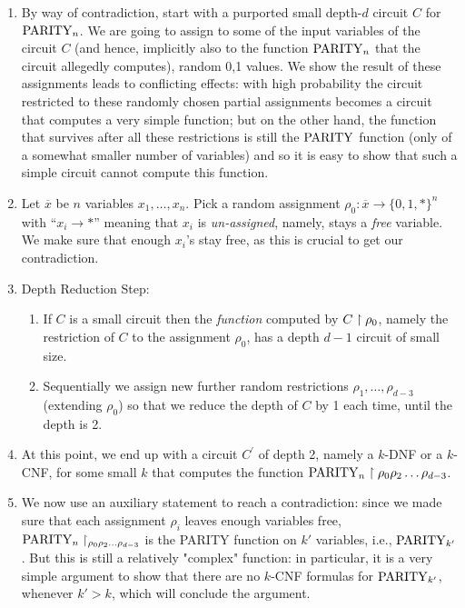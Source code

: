 \begin{enumerate}
\item By  way of contradiction, start with a purported small depth-$d$ circuit $C$ for $\operatorname{PARITY}_n$.
We are going to assign to some of the input variables of the circuit $C$ (and hence, implicitly also to the function $\operatorname{PARITY}_n$ that the circuit  allegedly  computes), random 0,1 values. We show the result of these assignments leads to conflicting effects: with high probability  the circuit restricted to these randomly chosen partial assignments becomes a circuit that computes a very simple function; but on the other hand,  the function that survives after all these restrictions is still the $\operatorname{PARITY}$ function (only of a somewhat smaller number of variables) and so it is easy to show that such a simple circuit cannot compute this function.

\item Let $\overline x$ be $n$ variables $x_1,\dots,x_n$. Pick a random assignment $\rho_0: \overline x \rightarrow\{0,1, *\}^n$ with ``$x_i \rightarrow *$'' meaning that $x_i$ is \emph{un-assigned}, namely, stays a \emph{free} variable. We make sure that enough $x_i$'s stay  free, as this is crucial to get our contradiction.
\label{it:two-165}

\item Depth Reduction Step: 

\begin{enumerate}
\item 
If $C$ is a small circuit then the \emph{function} computed by $C\upharpoonright\rho_0$, namely the restriction of $C$ to the assignment $\rho_0$, has a depth  $d-1$ circuit of small size. 

\item
Sequentially we assign new further random restrictions $\rho_1,\dots,\rho_{d-3}$
 (extending $\rho_0$) so that we reduce the depth of $C$ by 1 each time, until the depth is 2.
\end{enumerate}

\item 
At this point, we end up with a circuit $C^{\prime}$ of depth 2, namely a $k$-DNF or a $k$-CNF, for some small $k$ that computes the function 
$\operatorname{PARITY}_n\upharpoonright\rho_0\rho_2\ldots\rho_{d-3}$.

\item
We now use an auxiliary statement to reach a contradiction: since we made sure that each assignment $\rho_i$ leaves enough variables free, 
$\operatorname{PARITY}_n\upharpoonright_{\rho_0\rho_2\ldots\rho_{d-3}}$ is the PARITY function on $k'$ variables, i.e., $\operatorname{PARITY}_{k'}$. But this is still a relatively "complex" function:
in particular, it is a very simple argument to show that there are no $k$-CNF formulas for $\operatorname{PARITY}_{k'}$, whenever $k'>k$, which will conclude the argument.
\label{it:final-step:269}
\end{enumerate}



